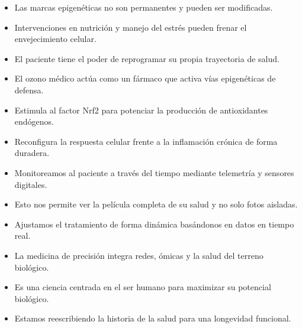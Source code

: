         \begin{itemize}
            \item Las marcas epigenéticas no son permanentes y pueden ser modificadas.
            \item Intervenciones en nutrición y manejo del estrés pueden frenar el envejecimiento celular.
            \item El paciente tiene el poder de reprogramar su propia trayectoria de salud.
        \end{itemize}

    
        \begin{itemize}
            \item El ozono médico actúa como un fármaco que activa vías epigenéticas de defensa.
            \item Estimula al factor Nrf2 para potenciar la producción de antioxidantes endógenos.
            \item Reconfigura la respuesta celular frente a la inflamación crónica de forma duradera.
        \end{itemize}

        \begin{itemize}
            \item Monitoreamos al paciente a través del tiempo mediante telemetría y sensores digitales.
            \item Esto nos permite ver la película completa de su salud y no solo fotos aisladas.
            \item Ajustamos el tratamiento de forma dinámica basándonos en datos en tiempo real.
        \end{itemize}

        \begin{itemize}
            \item La medicina de precisión integra redes, ómicas y la salud del terreno biológico.
            \item Es una ciencia centrada en el ser humano para maximizar su potencial biológico.
            \item Estamos reescribiendo la historia de la salud para una longevidad funcional.
        \end{itemize}

